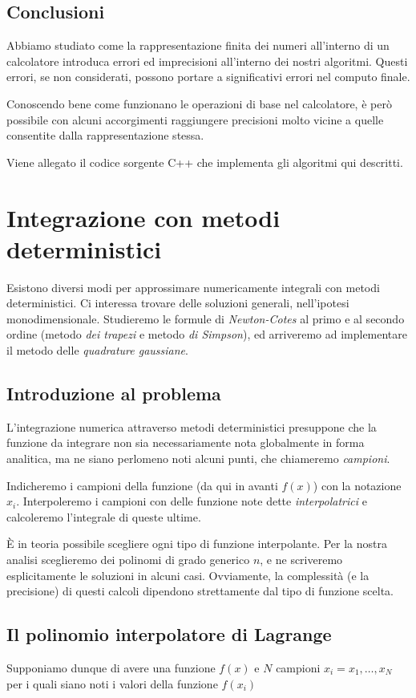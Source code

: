 \documentclass[a4paper,10pt]{article}
\begin{document}
\subsection{Conclusioni}
Abbiamo studiato come la rappresentazione finita dei numeri all'interno di un calcolatore introduca errori ed imprecisioni all'interno dei nostri algoritmi.
Questi errori, se non considerati, possono portare a significativi errori nel computo finale.

Conoscendo bene come funzionano le operazioni di base nel calcolatore, è però possibile con alcuni accorgimenti raggiungere precisioni molto vicine a quelle consentite dalla rappresentazione stessa.

Viene allegato il codice sorgente C++ che implementa gli algoritmi qui descritti.

\section{Integrazione con metodi deterministici}
Esistono diversi modi per approssimare numericamente integrali con metodi deterministici. Ci interessa trovare delle soluzioni generali, nell'ipotesi monodimensionale. Studieremo le formule di \emph{Newton-Cotes} al primo e al secondo ordine (metodo \emph{dei trapezi} e metodo \emph{di Simpson}), ed arriveremo ad implementare il metodo delle \emph{quadrature gaussiane}.

\subsection{Introduzione al problema}
L'integrazione numerica attraverso metodi deterministici presuppone che la funzione da integrare non sia necessariamente nota globalmente in forma analitica, ma ne siano perlomeno noti alcuni punti, che chiameremo \emph{campioni}.

Indicheremo i campioni della funzione (da qui in avanti $f(x)$) con la notazione $x_i$. Interpoleremo i campioni con delle funzione note dette \emph{interpolatrici} e calcoleremo l'integrale di queste ultime.

È in teoria possibile scegliere ogni tipo di funzione interpolante. Per la nostra analisi sceglieremo dei polinomi di grado generico $n$, e ne scriveremo esplicitamente le soluzioni in alcuni casi. Ovviamente, la complessità (e la precisione) di questi calcoli dipendono strettamente dal tipo di funzione scelta.

\subsection{Il polinomio interpolatore di Lagrange}
Supponiamo dunque di avere una funzione $f(x)$ e $N$ campioni $x_i = x_1, \dots, x_N$ per i quali siano noti i valori della funzione $f(x_i)$
\end{document}
